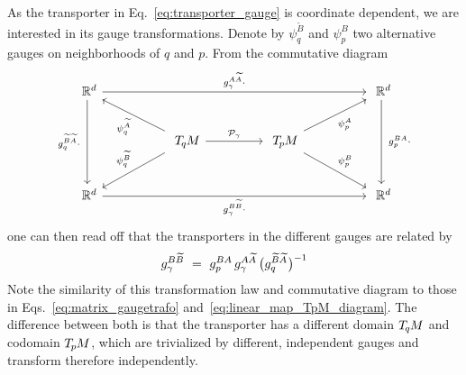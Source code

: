 As the transporter in Eq.~\eqref{eq:transporter_gauge} is coordinate dependent, we are interested in its gauge transformations.
Denote by $\psi_q^{\widetilde{B}}$ and $\psi_p^B$ two alternative gauges on neighborhoods of $q$ and $p$.
From the commutative diagram
\begin{equation}\label{cd:transporter_trivialization}
\begin{tikzcd}[column sep=50pt, row sep=25pt, font=\normalsize]
    \R^d
        \arrow[dd, "g_q^{\widetilde{B}\widetilde{A}}\cdot\ "']
        \arrow[rrr, "g_\gamma^{A\widetilde{A}}\cdot"]
    & &[-1ex] &
    \R^d
        \arrow[dd, "\ g_p^{BA}\cdot"]
    \\
    &
    \TqM
        \arrow[ul, "\psi_q^{\widetilde{A}}"]
        \arrow[dl, "\psi_q^{\widetilde{B}}"']
        \arrow[r, "\mathcal{P}_\gamma"]
    &
    \TpM
        \arrow[ur, "\psi_p^A"']
        \arrow[dr, "\psi_p^B"]
    \\
    \R^d
        \arrow[rrr, "g_\gamma^{B\widetilde{B}}\cdot"']
    & & &
    \R^d
\end{tikzcd}
\end{equation}
one can then read off that the transporters in the different gauges are related by
\begin{align}\label{eq:transporter_gauge_trafo}
    g_\gamma^{B\widetilde{B}}
    \ =\ g_p^{BA}\, g_\gamma^{A\widetilde{A}}\, \big(g_q^{\widetilde{B}\widetilde{A}} \mkern1mu\big)^{-1}
\end{align}
Note the similarity of this transformation law and commutative diagram to those in Eqs.~\eqref{eq:matrix_gaugetrafo} and~\eqref{eq:linear_map_TpM_diagram}.
The difference between both is that the transporter has a different domain $T_{\mkern-1.5mu q}\mkern-.5muM$ and codomain $T_{\mkern-1.5mu p}\mkern-.5muM$, which are trivialized by different, independent gauges and transform therefore independently.


